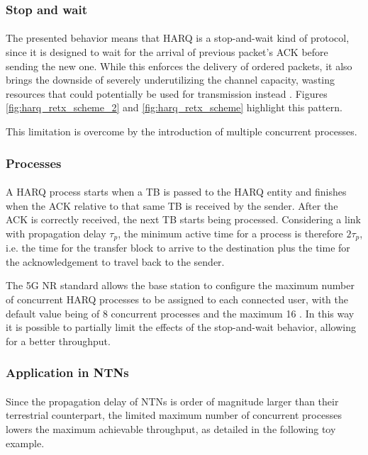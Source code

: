 \subsubsection{Stop and wait}
\paragraph{} The presented behavior means that \ac{HARQ} is a stop-and-wait kind of protocol, since it is designed to wait for the arrival of previous packet's \ac{ACK} before sending the new one. While this enforces the delivery of ordered packets, it also brings the downside of severely underutilizing the channel capacity, wasting resources that could potentially be used for transmission instead \cite{3gpp-ts-38.214}. Figures \ref{fig:harq_retx_scheme_2} and \ref{fig:harq_retx_scheme} highlight this pattern.

This limitation is overcome by the introduction of multiple concurrent processes.

\subsubsection{Processes}
\paragraph{}
A \ac{HARQ} process starts when a \ac{TB} is passed to the \ac{HARQ} entity and finishes when the \ac{ACK} relative to that same \ac{TB} is received by the sender. After the \ac{ACK} is correctly received, the next \ac{TB} starts being processed. Considering a link with propagation delay $\tau_p$, the minimum active time for a process is therefore $2\tau_p$, i.e. the time for the transfer block to arrive to the destination plus the time for the acknowledgement to travel back to the sender.

The 5G \ac{NR} standard allows the base station to configure the maximum number of concurrent \ac{HARQ} processes to be assigned to each connected user, with the default value being of 8 concurrent processes and the maximum 16 \cite{3gpp-ts-38.300, 5g-nr-harq-devopedia}. In this way it is possible to partially limit the effects of the stop-and-wait behavior, allowing for a better throughput.

\subsubsection{Application in NTNs}
\paragraph{}
Since the propagation delay of \ac{NTNs} is order of magnitude larger than their terrestrial counterpart, the limited maximum number of concurrent processes lowers the maximum achievable throughput, as detailed in the following toy example. 

